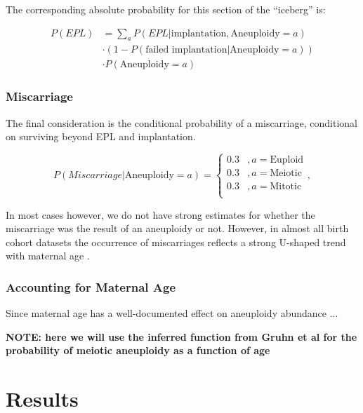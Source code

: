 \documentclass{article}
\begin{document}
The corresponding absolute probability for this section of the ``iceberg'' is: 

\begin{equation}
\begin{aligned}
P(EPL) &= \sum_{a} P(EPL | \text{implantation}, \text{Aneuploidy}=a) \\
&\cdot (1 - P(\text{failed implantation} | \text{Aneuploidy} = a))\\ 
&\cdot P(\text{Aneuploidy} = a)
\end{aligned}
\end{equation}

\subsubsection*{Miscarriage}

The final consideration is the conditional probability of a miscarriage, conditional on surviving beyond EPL and implantation. 

\begin{equation}
	P(Miscarriage | \text{Aneuploidy}=a) = \begin{cases}
	0.3 &, a= \text{Euploid}\\
	0.3 &, a = \text{Meiotic}\\
	0.3 &, a = \text{Mitotic}\\
	\end{cases},
\end{equation}


In most cases however, we do not have strong estimates for whether the miscarriage was the result of an aneuploidy or not. However, in almost all birth cohort datasets the occurrence of miscarriages reflects a strong U-shaped trend  with maternal age \citep{Gruhn2019-al}. 


\subsubsection*{Accounting for Maternal Age} 

Since maternal age has a well-documented effect on aneuploidy abundance ... 

\textbf{NOTE: here we will use the inferred function from Gruhn et al for the probability of meiotic aneuploidy as a function of age}



\section*{Results}






\end{document}
